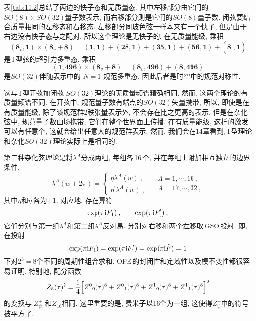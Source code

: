 表\ref{tab:11.2}总结了两边的快子态和无质量态. 其中左移部分由它们的$ SO(8)\times SO(32) $量子数表示, 而右移部分则是它们的$ SO(8) $量子数. 闭弦要结合质量相同的左移态和右移态. 左移部分同玻色弦一样本来有一个快子, 但是由于右边没有快子态与之配对, 所以这个理论是无快子的. 在无质量能级, 乘积
\begin{equation}
    (\mathbf{8}_{v},\mathbf{1})\times (\mathbf{8}_{v}+\mathbf{8}) =
    (\mathbf{1},\mathbf{1})+(\mathbf{28},\mathbf{1})+(\mathbf{35},\mathbf{1})+(\mathbf{56},\mathbf{1})+(\mathbf{8}^{\prime},\mathbf{1})\label{11.2.17}
\end{equation}
是\,I\,型弦的超引力多重态. 乘积
\begin{equation}
    (\mathbf{1},\mathbf{496})\times (\mathbf{8}_{v}+\mathbf{8}) = (\mathbf{8}_{v},\mathbf{496}) + (\mathbf{8},\mathbf{496})\label{11.2.18}
\end{equation}
是$ SO(32) $伴随表示中的 $N=1$ 规范多重态. 因此后者是时空中的规范对称性.

这与\,I\,型开弦加闭弦 $SO(32) $理论的无质量频谱精确相同. 然而, 这两个理论的有质量频谱不同. 在开弦中, 规范量子数有端点的$ SO(32) $矢量携带, 所以, 即使是在有质量能级, 除了该规范群2秩张量表示外, 不会存在比之更高的表示. 但是在杂化弦中, 规范量子数由场携带, 它们在整个世界面上传播. 在有质量能级, 这样的激发可以有任意个, 这就会给出任意大的规范群表示. 然而, 我们会在14章看到, I\,型理论和杂化$ SO(32) $理论实际上是相同的.

第二种杂化弦理论是将$ \lambda^{A} $分成两组, 每组各\,16\,个, 并在每组上附加相互独立的边界条件,
\begin{equation}
    \lambda^{A}(w+2\pi) = \left\{
    \begin{array}{l}
         \eta \lambda^{A}(w) \: ,\\
         \eta^{\prime} \lambda^{A}(w) \:, 
    \end{array} \quad 
    \begin{array}{l}
         A=1,\cdots,16\:,  \\
         A=17,\cdots,32 \:, 
    \end{array}
    \right. \label{11.2.19}
\end{equation}
其中$ \eta $和$ \eta^{\prime} $各为$ \pm1$. 对应地, 存在算符
\begin{equation}
    \exp(\pi\mathrm{i} F_{1}) \:, \qquad \exp(\pi\mathrm{i} F_{1}^{\prime}) \:, \label{11.2.20} 
\end{equation}
它们分别与第一组$ \lambda^{A} $和第二组$ \lambda^{A} $反对易. 分别对右移和两个左移取\,GSO\,投射. 即, 在投射
\begin{equation}
    \exp(\pi\mathrm{i} F_{1}) =\exp (\pi\mathrm{i} F_{1}^{\prime}) =\exp(\pi\mathrm{i} \tilde{F}) = 1  \label{11.2.21}
\end{equation}
下对$ 2^{3}=8 $个不同的周期性组合求和. OPE\,的封闭性和定域性以及模不变性都很容易证明. 特别地, 配分函数
\begin{equation}
    Z_{8}(\tau)^{2} = \frac{1}{4} \Bigl[Z^{0}{}_{0}(\tau)^{8} + Z^{0}{}_{1}(\tau)^{8}
    +Z^{1}{}_{0}(\tau)^{8} + Z^{1}{}_{1}(\tau)^{8} \Bigr]^{2} \label{11.2.22}
\end{equation}
的变换与 $Z_{\psi}^{\pm}$ 和$ Z_{16} $相同. 这里重要的是, 费米子以16个为一组, 这使得$ Z_{\psi}^{\pm} $中的符号被平方了.

